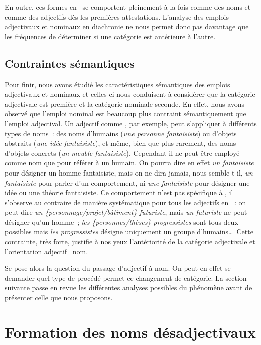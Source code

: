 \documentclass[output=paper]{LSP/langsci}
\begin{document}
En outre, ces formes en \iste\ se comportent pleinement à la fois comme des noms et comme des adjectifs dès les premières attestations. L'analyse des emplois adjectivaux et nominaux en diachronie ne nous permet donc pas davantage que les fréquences de déterminer si une catégorie est antérieure à l'autre. 



\subsection{Contraintes sémantiques}   \label{section:AmiotTribout:contraintes-sem}
Pour finir, nous avons étudié les caractéristiques sémantiques des emplois adjectivaux et nominaux et celles-ci nous conduisent à considérer que la catégorie adjectivale est première et la catégorie nominale seconde.  En effet, nous avons observé que l'emploi nominal est beaucoup plus contraint sémantiquement que l'emploi adjectival. Un adjectif comme , par exemple, peut s'appliquer à différents types de noms~: des noms d'humains (\textit{une personne fantaisiste}) ou d'objets abstraits (\textit{une idée fantaisiste}), et même, bien que plus rarement, des noms d'objets concrets (\textit{un meuble fantaisiste}). Cependant il ne peut être employé comme nom que pour référer à un humain. On pourra dire en effet \textit{un fantaisiste} pour désigner un homme fantaisiste, mais on ne dira jamais, nous semble-t-il, \textit{un fantaisiste} pour parler d'un comportement, ni \textit{une fantaisiste} pour désigner une idée ou une théorie fantaisiste. Ce comportement n'est pas spécifique à , il s'observe au contraire de manière systématique pour tous les adjectifs en \iste~: on peut dire \textit{un \{personnage/projet/bâtiment\} futuriste}, mais \textit{un futuriste} ne peut désigner qu'un homme~; \textit{les \{personnes/thèses\} progressistes} sont tous deux possibles mais \textit{les progressistes} désigne uniquement un groupe d'humains\ldots\ Cette contrainte, très forte, justifie à nos yeux l'antériorité de la catégorie adjectivale et l'orientation adjectif \orientd\ nom.

Se pose alors la question du passage d'adjectif à nom. On peut en effet se demander quel type de procédé permet ce changement de catégorie. La section suivante passe en revue les différentes analyses possibles du phénomène avant de  présenter celle que nous proposons. 


\section{Formation des noms désadjectivaux} \label{section:AmiotTribout:formation-N}
\end{document}
